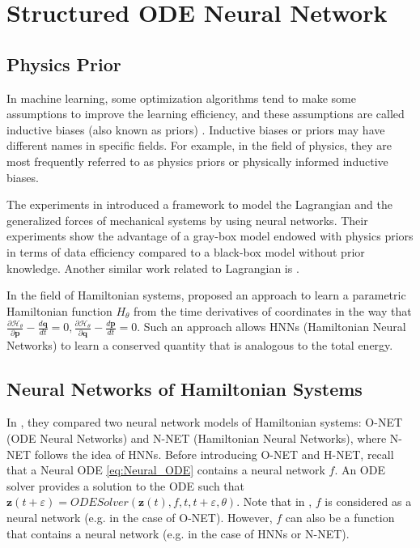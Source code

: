 \documentclass[
	parskip, 			   %
	twoside, 			   %
	DIV=14, 			   %
	BCOR=15.0mm, 		   %
	headsepline, 		   %
	open=right, 		   %
	captions=tableheading, %
	bibliography=totoc,    %
	numbers=noenddot       %
]{scrreprt}
\begin{document}
\clearpage
\chapter{Structured ODE Neural Network}
\label{ch:chapter6}
\section{Physics Prior}
In machine learning, some optimization algorithms tend to make some assumptions to improve the learning efficiency, and these assumptions are called inductive biases (also known as priors) \cite{mitchell1997machine}. Inductive biases or priors may have different names in specific fields. For example, in the field of physics, they are most frequently referred to as physics priors or physically informed inductive biases.

The experiments in \cite{gupta2019general} introduced a framework to model the Lagrangian and the generalized forces of mechanical systems by using neural networks. Their experiments show the advantage of a gray-box model endowed with physics priors in terms of data efficiency compared to a black-box model without prior knowledge. Another similar work related to Lagrangian is \cite{lutter2019deep}.

In the field of Hamiltonian systems, \cite{greydanus2019hamiltonian} proposed an approach to learn a parametric Hamiltonian function $H_{\theta}$ from the time derivatives of coordinates in the way that $\frac{\partial \mathcal{H}_{\theta}}{\partial \mathbf{p}} - \frac{d\mathbf{q}}{dt} = 0, \frac{\partial \mathcal{H}_{\theta}}{\partial \mathbf{q}} - \frac{d\mathbf{p}}{dt} = 0 $. Such an approach allows HNNs (Hamiltonian Neural Networks) to learn a conserved quantity that is analogous to the total energy.

\section{Neural Networks of Hamiltonian Systems}
In \cite{chen2019symplectic}, they compared two neural network models of Hamiltonian systems: O-NET (ODE Neural Networks) and N-NET (Hamiltonian Neural Networks), where N-NET follows the idea of HNNs. 
Before introducing O-NET and H-NET, recall that a Neural ODE \ref{eq:Neural_ODE} contains a neural network $f$. An ODE solver provides a solution to the ODE such that $\mathbf{z}(t+\varepsilon) = ODESolver(\mathbf{z}(t), f, t, t+\varepsilon , \theta)$. Note that in \cite{chen2019symplectic}, $f$ is considered as a neural network (e.g. in the case of O-NET). However, $f$ can also be a function that contains a neural network (e.g. in the case of HNNs or N-NET).
\end{document}
